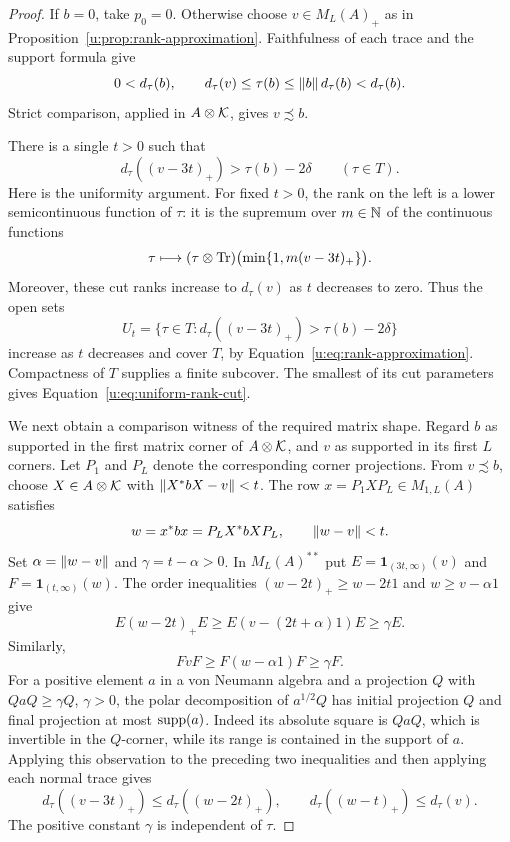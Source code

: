\begin{proof}
If $b=0$, take $p_0=0$.  Otherwise choose $v\in M_L(A)_+$ as in
Proposition~\ref{u:prop:rank-approximation}.  Faithfulness of each trace
and the support formula give
\[
 0<d_\tau(b),\qquad
 d_\tau(v)\le\tau(b)\le\lVert b\rVert\,d_\tau(b)<d_\tau(b).
\]
Strict comparison, applied in $A\otimes\mathcal K$, gives $v\precsim b$.

There is a single $t>0$ such that
\begin{equation}
 d_\tau((v-3t)_+)>\tau(b)-2\delta
 \qquad(\tau\in T).
 \label{u:eq:uniform-rank-cut}
\end{equation}
Here is the uniformity argument.  For fixed $t>0$, the rank on the
left is a lower semicontinuous function of $\tau$: it is the supremum
over $m\in\mathbb N$ of the continuous functions
\[
 \tau\longmapsto(\tau\otimes\operatorname{Tr})
       \bigl(\min\{1,m(v-3t)_+\}\bigr).
\]
Moreover, these cut ranks increase to $d_\tau(v)$ as $t$ decreases to
zero.  Thus the open sets
\[
 U_t=\{\tau\in T:
       d_\tau((v-3t)_+)>\tau(b)-2\delta\}
\]
increase as $t$ decreases and cover $T$, by
Equation~\eqref{u:eq:rank-approximation}.  Compactness of $T$ supplies
a finite subcover.  The smallest of its cut parameters gives
Equation~\eqref{u:eq:uniform-rank-cut}.

We next obtain a comparison witness of the required matrix shape.
Regard $b$ as supported in the first matrix corner of $A\otimes\mathcal K$,
and $v$ as supported in its first $L$ corners.  Let $P_1$ and $P_L$
denote the corresponding corner projections.  From $v\precsim b$,
choose $X\in A\otimes\mathcal K$ with $\lVert X^*bX-v\rVert<t$.  The row
$x=P_1XP_L\in M_{1,L}(A)$ satisfies
\[
 w=x^*bx=P_LX^*bXP_L,\qquad \lVert w-v\rVert<t.
\]
Set $\alpha=\lVert w-v\rVert$ and $\gamma=t-\alpha>0$.  In
$M_L(A)^{**}$ put
$E=\mathbf 1_{(3t,\infty)}(v)$ and
$F=\mathbf 1_{(t,\infty)}(w)$.  The order inequalities
$(w-2t)_+\ge w-2t1$ and $w\ge v-\alpha1$ give
\[
 E(w-2t)_+E
 \ge E(v-(2t+\alpha)1)E\ge\gamma E.
\]
Similarly,
\[
 FvF\ge F(w-\alpha1)F\ge\gamma F.
\]
For a positive element $a$ in a von Neumann algebra and a projection
$Q$ with $QaQ\ge\gamma Q$, $\gamma>0$, the polar decomposition of
$a^{1/2}Q$ has initial projection $Q$ and final projection at most
$\operatorname{supp}(a)$.  Indeed its absolute square is $QaQ$, which is invertible
in the $Q$-corner, while its range is contained in the support of $a$.
Applying this observation to the preceding two inequalities and then
applying each normal trace gives
\begin{equation}
 d_\tau((v-3t)_+)\le d_\tau((w-2t)_+),
 \qquad d_\tau((w-t)_+)\le d_\tau(v).
 \label{u:eq:perturbed-ranks}
\end{equation}
The positive constant $\gamma$ is independent of $\tau$.


\end{proof}
